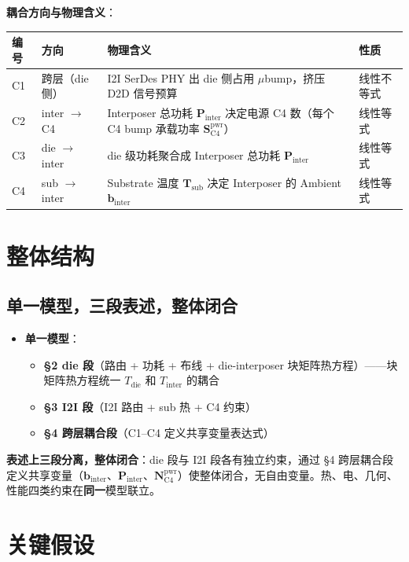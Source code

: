 \documentclass[11pt]{article}
\newcommand{\bv}{\mathbf}
\begin{document}
\textbf{耦合方向与物理含义}：

\begin{center}
\begin{tabularx}{\textwidth}{@{}lXXl@{}}
\toprule
编号 & 方向 & 物理含义 & 性质 \\
\midrule
C1 & 跨层（die 侧） & I2I SerDes PHY 出 die 侧占用 $\mu$bump，挤压 D2D 信号预算 & 线性不等式 \\
C2 & inter $\to$ C4 & Interposer 总功耗 $\bv{P}_{\text{inter}}$ 决定电源 C4 数（每个 C4 bump 承载功率 $\bv{S}_{\text{C4}}^{\text{pwr}}$） & 线性等式 \\
C3 & die $\to$ inter & die 级功耗聚合成 Interposer 总功耗 $\bv{P}_{\text{inter}}$ & 线性等式 \\
C4 & sub $\to$ inter & Substrate 温度 $\bv{T}_{\text{sub}}$ 决定 Interposer 的 Ambient $\bv{b}_{\text{inter}}$ & 线性等式 \\
\bottomrule
\end{tabularx}
\end{center}

\section{整体结构}

\subsection{单一模型，三段表述，整体闭合}

\begin{itemize}
\item \textbf{单一模型}：
  \begin{itemize}
  \item \textbf{§2 die 段}（路由 + 功耗 + 布线 + die-interposer 块矩阵热方程）——块矩阵热方程统一 $T_{\text{die}}$ 和 $T_{\text{inter}}$ 的耦合
  \item \textbf{§3 I2I 段}（I2I 路由 + sub 热 + C4 约束）
  \item \textbf{§4 跨层耦合段}（C1--C4 定义共享变量表达式）
  \end{itemize}
\end{itemize}

\textbf{表述上三段分离，整体闭合}：die 段与 I2I 段各有独立约束，通过 §4 跨层耦合段定义共享变量（$\bv{b}_{\text{inter}}$、$\bv{P}_{\text{inter}}$、$\bv{N}_{\text{C4}}^{\text{pwr}}$）使整体闭合，无自由变量。热、电、几何、性能四类约束在\textbf{同一}模型联立。

\section{关键假设}
\end{document}
